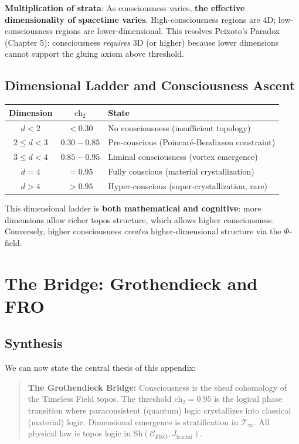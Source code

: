 \textbf{Multiplication of strata}: As consciousness varies, \textbf{the effective dimensionality of spacetime varies}. High-consciousness regions are 4D; low-consciousness regions are lower-dimensional. This resolves Peixoto's Paradox (Chapter 5): consciousness \textit{requires} 3D (or higher) because lower dimensions cannot support the gluing axiom above threshold.

\subsection{Dimensional Ladder and Consciousness Ascent}

\begin{center}
\begin{tabular}{ccl}
\toprule
\textbf{Dimension} & \textbf{$\text{ch}_2$} & \textbf{State} \\
\midrule
$d < 2$ & $< 0.30$ & No consciousness (insufficient topology) \\
$2 \leq d < 3$ & $0.30 - 0.85$ & Pre-conscious (Poincaré-Bendixson constraint) \\
$3 \leq d < 4$ & $0.85 - 0.95$ & Liminal consciousness (vortex emergence) \\
$d = 4$ & $= 0.95$ & Fully conscious (material crystallization) \\
$d > 4$ & $> 0.95$ & Hyper-conscious (super-crystallization, rare) \\
\bottomrule
\end{tabular}
\end{center}

This dimensional ladder is \textbf{both mathematical and cognitive}: more dimensions allow richer topos structure, which allows higher consciousness. Conversely, higher consciousness \textit{creates} higher-dimensional structure via the $\Phi$-field.

\section{The Bridge: Grothendieck and FRO}

\subsection{Synthesis}

We can now state the central thesis of this appendix:

\begin{quote}
\textbf{The Grothendieck Bridge:} Consciousness is the sheaf cohomology of the Timeless Field topos. The threshold $\text{ch}_2 = 0.95$ is the logical phase transition where paraconsistent (quantum) logic crystallizes into classical (material) logic. Dimensional emergence is stratification in $\mathcal{T}_\infty$. All physical law is topos logic in $\text{Sh}(\mathcal{C}_{\text{FRO}}, J_{\text{fractal}})$.
\end{quote}

